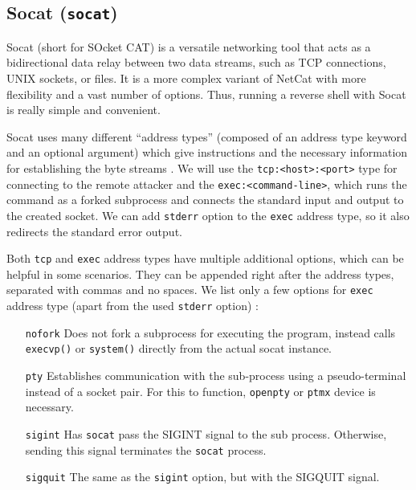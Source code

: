 

\subsection{Socat (\texttt{socat})}


Socat (short for SOcket CAT) is a versatile networking tool that acts as a bidirectional data relay between two data streams, such as TCP connections, UNIX sockets, or files. It is a more complex variant of NetCat with more flexibility and a vast number of options. Thus, running a reverse shell with Socat is really simple and convenient.

Socat uses many different ``address types'' (composed of an address type keyword and an optional argument) which give instructions and the necessary information for establishing the byte streams \cite{socat-man}. We will use the \texttt{tcp:<host>:<port>} type for connecting to the remote attacker and the \texttt{exec:<command-line>}, which runs the command as a forked subprocess and connects the standard input and output to the created socket. We can add \texttt{stderr} option to the \texttt{exec} address type, so it also redirects the standard error output.


Both \texttt{tcp} and \texttt{exec} address types have multiple additional options, which can be helpful in some scenarios. They can be appended right after the address types, separated with commas and no spaces. We list only a few options for \texttt{exec} address type (apart from the used \texttt{stderr} option) \cite{socat-man}:

\setlength{\leftmargini}{5em}
\begin{itemize}
\item[\texttt{nofork}] Does not fork a subprocess for executing the program, instead calls \texttt{execvp()} or \texttt{system()} directly from the actual socat instance.
\item[\texttt{pty}] Establishes communication with the sub-process using a pseudo-terminal instead of a socket pair. For this to function, \texttt{openpty} or \texttt{ptmx} device is necessary.
\item[\texttt{sigint}] Has \texttt{socat} pass the SIGINT signal to the sub process. Otherwise, sending this signal terminates the \texttt{socat} process.
\item[\texttt{sigquit}] The same as the \texttt{sigint} option, but with the SIGQUIT signal.
\end{itemize}
\setlength{\leftmargini}{2.5em}



